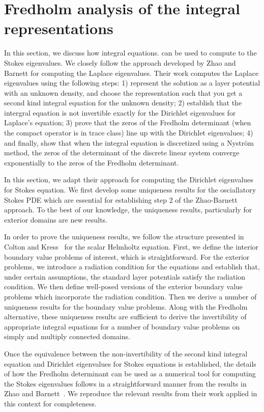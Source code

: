 \section{Fredholm analysis of the integral representations}

In this section, we discuss how integral equations.
can be used to compute to the Stokes eigenvalues.
%
We closely follow the approach developed by Zhao and Barnett
for computing the Laplace eigenvalues.
%
Their work computes the Laplace eigenvalues using the following
steps: 1) represent the solution 
as a layer potential with 
an unknown density, and choose the representation such that
you get a second kind integral equation for the unknown density;
2) establish that the intergral equation is not invertible 
exactly for the Dirichlet eigenvalues for Laplace's equation;
3) prove that the zeros of the Fredholm determinant 
(when the compact operator is in trace class) 
line up with the Dirichlet eigenvalues; 
4) and finally, show that when the integral equation
is discretized using a Nystr\"{o}m method, the zeros of 
the determinant 
of the discrete linear system 
converge exponentially
to the zeros of the Fredholm determinant. 


In this section, we adapt their approach for computing the 
Dirichlet eigenvalues for Stokes equation. 
%
We first develop some uniqueness
results for the osciallatory Stokes PDE which are essential
for establishing step 2 of the Zhao-Barnett approach.
To the best of our knowledge, the uniqueness results, particularly
for exterior domains are new results. 


In order to prove the uniqueness results, we follow the 
structure presented in Colton and Kress~\cite[Ch. 3]{colton1983integral}
for the scalar Helmholtz equation.
%
First, we define the interior boundary value problems
of interest, which is straightforward.
%
For the exterior problems, we introduce a radiation condition
for the equations and establish that, under certain assumptions,
the standard layer potentials satisfy the radiation condition.
%
We then define well-posed versions of the
exterior boundary value problems which incorporate the
radiation condition.
%
Then we derive a number of uniqueness
results for the boundary value problems.
%
Along with the Fredholm alternative, these uniqueness
results are sufficient to derive the invertibility of appropriate
integral equations for a number of boundary value problems
on simply and multiply connected domains.


Once the equivalence between the non-invertibility
of the second kind integral equation and Dirichlet eigenvalues
for Stokes equations is established,
the details of how the Fredholm determinant can be used as a
numerical tool for computing the Stokes eigenvalues
follows in a straightforward manner from the results 
in Zhao and Barnett~\cite{zhao2015robust}. 
We reproduce the relevant results from their work applied 
in this context for completeness.


